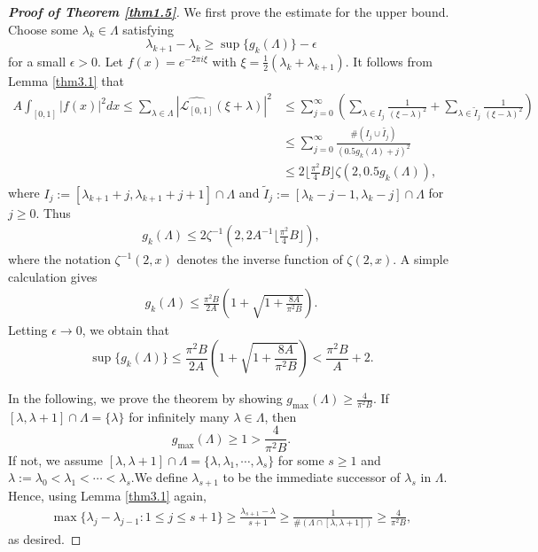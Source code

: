 \documentclass[12pt,psfig,reqno]{amsart}
\numberwithin{equation}{section}
\theoremstyle{plain}
\begin{document}
\begin{proof}[\textbf{Proof of Theorem \ref{thm1.5}}]
We first prove the estimate for the upper bound. 
		Choose some $\lambda_k\in\Lambda$ satisfying $$
		\lambda_{k+1}-\lambda_k\geq \sup\{g_k(\Lambda)\}-\epsilon
		$$
		for a small $\epsilon>0$. 
		Let $f(x)=e^{-2\pi i\xi}$ with $\xi=\frac{1}{2}(\lambda_k+\lambda_{k+1})$. 
It follows from Lemma \ref{thm3.1} that 
		\begin{align*}
			A\int_{[0,1]}|f(x)|^2dx\leq \sum_{\lambda\in\Lambda}|\widehat{\mathcal{L}_{[0,1]}}(\xi+\lambda)|^2&\leq \sum_{j=0}^\infty(\sum_{\lambda\in I_j}\frac{1}{(\xi-\lambda)^2}+\sum_{\lambda\in \widetilde{I}_j}\frac{1}{(\xi-\lambda)^2})
			\\
			&\leq \sum_{j=0}^\infty\frac{\#(I_j\cup\widetilde{I_j})}{(0.5g_{k}(\Lambda)+j)^2}
					\\
			&\leq 2\lfloor \frac{\pi^2}{4}B \rfloor \zeta(2,0.5g_k(\Lambda)),
		\end{align*}
		where $I_j:=[\lambda_{k+1}+j,\lambda_{k+1}+j+1]\cap\Lambda$ and $\widetilde{I}_j:=[\lambda_{k}-j-1,\lambda_{k}-j]\cap\Lambda$ for $j\geq0$. 
	Thus 
	\begin{align*}
		g_k(\Lambda)\leq 2\zeta^{-1}(2,2A^{-1}\lfloor \frac{\pi^2}{4}B \rfloor),
	\end{align*}	
	where the notation $\zeta^{-1}(2,x)$ denotes the inverse function of $\zeta(2,x)$. 
	A simple calculation gives 
	\begin{align*}
		g_k(\Lambda)\leq \frac{\pi^2B}{2A}(1+\sqrt{1+\frac{8A}{\pi^2B}}).
	\end{align*}
	Letting $\epsilon\rightarrow0$, we obtain that 
	$$\sup\{g_k(\Lambda)\}\leq \frac{\pi^2B}{2A}(1+\sqrt{1+\frac{8A}{\pi^2B}})< \frac{\pi^2B}{A}+2.$$
	
	In the following, we prove the theorem by showing $g_{\max}(\Lambda)\geq \frac{4}{\pi^2B}$. 
If $[\lambda,\lambda+1]\cap\Lambda=\{\lambda\}$ for infinitely many $\lambda\in\Lambda$, then $$g_{\max}(\Lambda)\geq 1>\frac{4}{\pi^2B}.
$$ 
If not, we assume $[\lambda,\lambda+1]\cap\Lambda=\{\lambda,\lambda_1,\cdots,\lambda_s\}$ for some $s\geq1$ and $\lambda:=\lambda_0<\lambda_1<\cdots<\lambda_s$.We define $\lambda_{s+1}$ to be the immediate successor of $\lambda_s$ in $\Lambda$.
Hence, using Lemma \ref{thm3.1} again,  
\begin{align*}
	\max\{\lambda_j-\lambda_{j-1}:1\leq j\leq s+1\}\geq \frac{\lambda_{s+1}-\lambda}{s+1}\geq \frac{1}{\#(\Lambda\cap[\lambda,\lambda+1])}\geq \frac{4}{\pi^2B}, 
\end{align*}
as desired. 
\end{proof}
\end{document}
